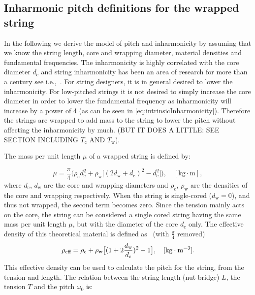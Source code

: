\documentclass{article}
\begin{document}
\begin{sloppy}
\subsection{Inharmonic pitch definitions for the wrapped string %
}

In the following we derive the model of pitch and inharmonicity by assuming that we know the string length, core and wrapping diameter,  material densities and fundamental frequencies. The inharmonicity is highly correlated with the core diameter $d_\text{c}$ and string inharmonicity has been an area of research for more than a century see i.e.,~\cite{rayleigh:sound}. For string designers, it is in general desired to lower the inharmonicity. For low-pitched strings it is not desired to simply increase the core diameter in order to lower the fundamental frequency as inharmonicity will increase by a power of 4 (as can be seen in \eqref{eq:intrinsicInharmonicity}). Therefore the strings are wrapped to add mass to the string to lower the pitch without affecting the inharmonicity by much. (BUT IT DOES A LITTLE: SEE SECTION INCLUDING $T_\text{c}$ AND $T_\text{w}$).

\noindent The mass per unit length $\mu$ of a wrapped string is defined by:

\begin{equation}
    \mu = \frac{\pi}{4}\Big(\rho_\text{c}d_\text{c}^2 + \rho_\text{w}\big[(2d_\text{w}+d_\text{c})^2-d_\text{c}^2\big]\Big), \quad [\text{kg}\cdot\text{m}],
\end{equation}
where $d_\text{c}$, $d_\text{w}$ are the core and wrapping diameters and $\rho_\text{c}$, $\rho_\text{w}$ are the densities of the core and wrapping respectively. When the string is single-cored ($d_\text{w} = 0$), and thus not wrapped, the second term becomes zero. Since the tension mainly acts on the core, the string can be considered a single cored string having the same mass per unit length $\mu$, but with the diameter of the core $d_\text{c}$ only. The effective density of this theoretical material is defined as~\cite{firth:string_design} (with $\frac{\pi}{4}$ removed)
\begin{equation}
    \rho_{\textup{eff}} = \rho_\text{c} + \rho_\text{w} \big[(1+2\frac{d_\text{w}}{d_\text{c}})^2-1\big], \quad [\text{kg}\cdot\text{m}^{-3}].
\end{equation}
This effective density can be used to calculate the pitch for the string, from the tension and length. The relation between the string length (nut-bridge) $L$, the tension $T$ and the pitch $\omega_0$ is:


\end{sloppy}
\end{document}
